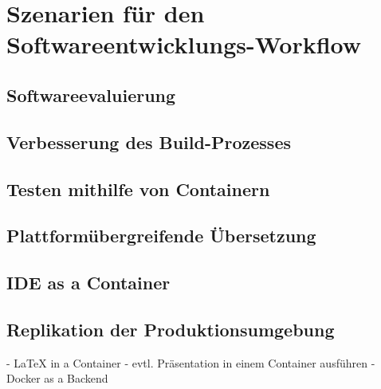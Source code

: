 \chapter{Szenarien für den Softwareentwicklungs-Workflow}
\label{cha:szenarien}
\section{Softwareevaluierung}
\label{sec:softwareevaluierung}
\section{Verbesserung des Build-Prozesses}
\label{sec:build-prozess-verbesserung}
\section{Testen mithilfe von Containern}
\label{sec:containerbasiertes-testen}
\section{Plattformübergreifende Übersetzung}
\label{sec:plattformuebergreifende-uebersetzung}
\section{IDE as a Container}
\label{sec:ideasacontainer}
\section{Replikation der Produktionsumgebung}
\label{sec:replikation-produktionsumgebung}

- LaTeX in a Container
- evtl. Präsentation in einem Container ausführen
- Docker as a Backend
